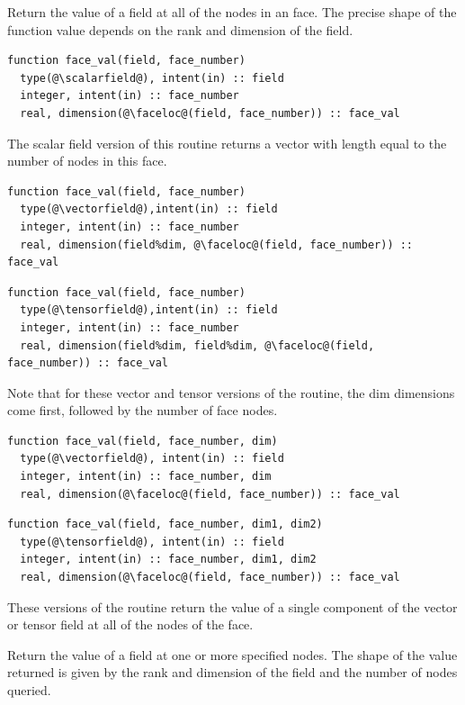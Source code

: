 \documentclass[a4paper, 11pt]{book}
\begin{document}

Return the value of a field at all of the nodes in an face. The precise
shape of the function value depends on the rank and dimension of the field.

\begin{lstlisting}
function face_val(field, face_number) 
  type(@\scalarfield@), intent(in) :: field
  integer, intent(in) :: face_number
  real, dimension(@\faceloc@(field, face_number)) :: face_val
\end{lstlisting}
The scalar field version of this routine returns a vector with length equal
to the number of nodes in this face.

\begin{lstlisting}
function face_val(field, face_number)
  type(@\vectorfield@),intent(in) :: field
  integer, intent(in) :: face_number
  real, dimension(field%dim, @\faceloc@(field, face_number)) :: face_val
\end{lstlisting}
\begin{lstlisting}
function face_val(field, face_number)
  type(@\tensorfield@),intent(in) :: field
  integer, intent(in) :: face_number
  real, dimension(field%dim, field%dim, @\faceloc@(field, face_number)) :: face_val
\end{lstlisting}
Note that for these vector and tensor versions of the routine, the dim
dimensions come first, followed by the number of face nodes.

\begin{lstlisting}
function face_val(field, face_number, dim) 
  type(@\vectorfield@), intent(in) :: field
  integer, intent(in) :: face_number, dim
  real, dimension(@\faceloc@(field, face_number)) :: face_val
\end{lstlisting}
\begin{lstlisting}
function face_val(field, face_number, dim1, dim2) 
  type(@\tensorfield@), intent(in) :: field
  integer, intent(in) :: face_number, dim1, dim2
  real, dimension(@\faceloc@(field, face_number)) :: face_val
\end{lstlisting}
These versions of the routine return the value of a single component of the
vector or tensor field at all of the nodes of the face. 


Return the value of a field at one or more specified nodes. The shape of the
value returned is given by the rank and dimension of the field and the
number of nodes queried.
\end{document}
